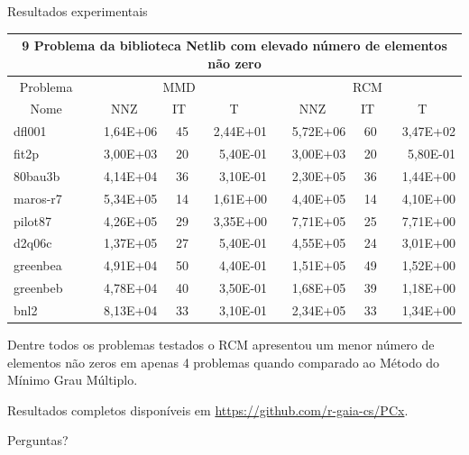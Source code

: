 \documentclass[10pt]{beamer}
\begin{document}
\begin{frame}[fragile]{Resultados experimentais}
  \begin{center}
\begin{tabular}{|l|r|r|r|r|r|r|}
\hline
\multicolumn{7}{|c|}{9 Problema da biblioteca Netlib com elevado número de
elementos não zero} \\ \hline
\multicolumn{1}{|c|}{Problema} & \multicolumn{3}{|c|}{MMD} &         \multicolumn{3}{|c|}{RCM} \\ \hline
\multicolumn{1}{|c|}{Nome} &
        \multicolumn{1}{|c|}{NNZ} & \multicolumn{1}{|c|}{IT} &
        \multicolumn{1}{|c|}{T} &
        \multicolumn{1}{|c|}{NNZ} & \multicolumn{1}{|c|}{IT} &
        \multicolumn{1}{|c|}{T} \\ \hline
dfl001       & 1,64E+06 & 45 & 2,44E+01 & 5,72E+06 & 60 & 3,47E+02 \\ \hline
fit2p        & 3,00E+03 & 20 & 5,40E-01 & 3,00E+03 & 20 & 5,80E-01 \\ \hline
80bau3b      & 4,14E+04 & 36 & 3,10E-01 & 2,30E+05 & 36 & 1,44E+00 \\ \hline
maros-r7     & 5,34E+05 & 14 & 1,61E+00 & 4,40E+05 & 14 & 4,10E+00 \\ \hline
pilot87      & 4,26E+05 & 29 & 3,35E+00 & 7,71E+05 & 25 & 7,71E+00 \\ \hline
d2q06c       & 1,37E+05 & 27 & 5,40E-01 & 4,55E+05 & 24 & 3,01E+00 \\ \hline
greenbea     & 4,91E+04 & 50 & 4,40E-01 & 1,51E+05 & 49 & 1,52E+00 \\ \hline
greenbeb     & 4,78E+04 & 40 & 3,50E-01 & 1,68E+05 & 39 & 1,18E+00 \\ \hline
bnl2         & 8,13E+04 & 33 & 3,10E-01 & 2,34E+05 & 33 & 1,34E+00 \\ \hline
\end{tabular}
  \end{center}

Dentre todos os problemas testados o RCM apresentou um menor número de elementos
não zeros em apenas 4 problemas quando comparado ao Método do Mínimo Grau
Múltiplo.

Resultados completos disponíveis em \url{https://github.com/r-gaia-cs/PCx}.
\end{frame}

\begin{frame}
  \begin{center}
    Perguntas?
  \end{center}
\end{frame}
\end{document}
